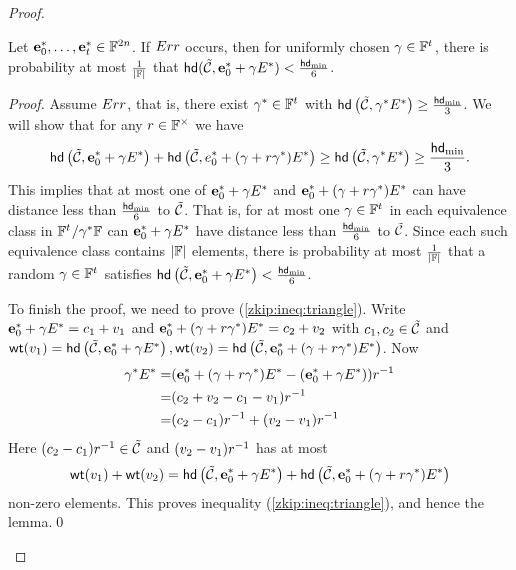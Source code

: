 \begin{proof}
\begin{lemma}%
Let $\mathbf{e}^*_0,\ldots, \mathbf{e}^*_{{t_{}}}\in \mathbb{F}^{2n}$. If $Err$ occurs, then for uniformly chosen ${\mathbf{\gamma}}\in \mathbb{F}^{t_{}}$, there is probability at most $\frac{1}{|\mathbb{F} |}$ that $\mathsf{hd}(\tilde{\mathcal{C}},{\mathbf{e}^*_0}+{\mathbf{\gamma}} E^*)<\frac{\mathsf{hd}_{\mathrm{min}}}{6}$.
\end{lemma}

\begin{proof}
Assume $Err$, that is, there exist ${\mathbf{\gamma}}^*\in \mathbb{F}^{{t_{}}}$ with $\mathsf{hd}\left(\tilde{\mathcal{C}}, {\mathbf{\gamma}}^* E^*\right)\geq \frac{\mathsf{hd}_{\mathrm{min}}}{3}$. We will show that for any $r\in \mathbb{F}^{\times}$ we have 
\begin{align}\mathsf{hd}\left(\tilde{\mathcal{C}},{\mathbf{e}^*_0}+{\mathbf{\gamma}} E^*\right)+\mathsf{hd}\left(\tilde{\mathcal{C}},e^*_0+({\mathbf{\gamma}}+r{\mathbf{\gamma}}^*)E^*\right)\geq \mathsf{hd}\left(\tilde{\mathcal{C}},{\mathbf{\gamma}}^* E^*\right)\geq \frac{\mathsf{hd}_{\mathrm{min}}}{3}.\label{zkip:ineq:triangle}
\end{align}
This implies that at most one of ${\mathbf{e}^*_0}+{\mathbf{\gamma}} E^*$ and $\mathbf{e}^*_0+({\mathbf{\gamma}}+r{\mathbf{\gamma}}^*) E^*$ can have distance less than $\frac{\mathsf{hd}_{\mathrm{min}}}{6}$ to $\tilde{\mathcal{C}}$. That is, for at most one ${\mathbf{\gamma}}\in \mathbb{F}^{{t_{}}}$ in each equivalence class in $\mathbb{F}^{t_{}}/ {\mathbf{\gamma}}^* \mathbb{F}$ can ${\mathbf{e}^*_0}+{\mathbf{\gamma}} E^*$ have distance less than $\frac{\mathsf{hd}_{\mathrm{min}}}{6}$ to $\tilde{\mathcal{C}}$. Since each such equivalence class contains $|\mathbb{F}|$ elements, there is probability at most $\frac{1}{|\mathbb{F}|}$ that a random ${\mathbf{\gamma}}\in\mathbb{F}^{{t_{}}}$ satisfies $\mathsf{hd}\left(\tilde{\mathcal{C}},{\mathbf{e}^*_0}+{\mathbf{\gamma}} E^*\right)<\frac{\mathsf{hd}_{\mathrm{min}}}{6}$. 

To finish the proof, we need to prove (\ref{zkip:ineq:triangle}). Write ${\mathbf{e}^*_0}+{\mathbf{\gamma}} E^*=c_1+v_1$ and $\mathbf{e}^*_0+({\mathbf{\gamma}}+r{\mathbf{\gamma}}^*) E^*=c_2+v_2$ with $c_1,c_2\in \tilde{\mathcal{C}}$ and $\mathsf{wt}(v_1)=\mathsf{hd}\left(\tilde{\mathcal{C}},{\mathbf{e}^*_0}+{\mathbf{\gamma}} E^*\right), \mathsf{wt}(v_2)=\mathsf{hd}\left(\tilde{\mathcal{C}},\mathbf{e}^*_0+({\mathbf{\gamma}}+r{\mathbf{\gamma}}^*) E^*\right)$. Now 
\begin{align*}{\mathbf{\gamma}}^* E^*=&(\mathbf{e}^*_0+({\mathbf{\gamma}}+r{\mathbf{\gamma}}^*) E^* - ({\mathbf{e}^*_0}+{\mathbf{\gamma}} E^*))r^{-1}\\
=&(c_2+v_2-c_1-v_1)r^{-1}\\
=& (c_2-c_1)r^{-1} + (v_2-v_1)r^{-1}
\end{align*}
Here $ (c_2-c_1)r^{-1}\in \tilde{\mathcal{C}}$ and $(v_2-v_1)r^{-1}$ has at most 
\[\mathsf{wt}(v_1)+\mathsf{wt}(v_2)=\mathsf{hd}\left(\tilde{\mathcal{C}},{\mathbf{e}^*_0}+{\mathbf{\gamma}} E^*\right)+\mathsf{hd}\left(\tilde{\mathcal{C}},\mathbf{e}^*_0+({\mathbf{\gamma}}+r{\mathbf{\gamma}}^*) E^* \right)\]
non-zero elements. This proves inequality (\ref{zkip:ineq:triangle}), and hence the lemma.\qed
\end{proof}


\end{proof}
